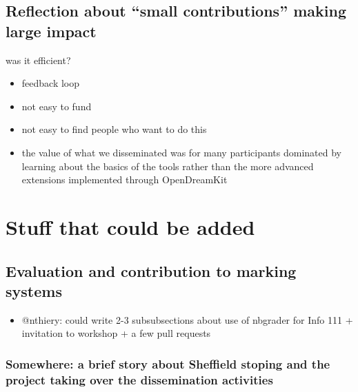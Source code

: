 \documentclass{deliverablereport}
\begin{document}
\subsection{Reflection about ``small contributions'' making large  impact}

was it efficient?

\begin{itemize}
\tightlist
\item
  feedback loop
\item
  not easy to fund
\item
  not easy to find people who want to do this
\item
  the value of what we disseminated was for many participants dominated
  by learning about the basics of the tools rather than the more
  advanced extensions implemented through OpenDreamKit
\end{itemize}

\section{Stuff that could be added}

\subsection{Evaluation and contribution to marking systems}

\begin{itemize}
\tightlist
\item
  @nthiery: could write 2-3 subsubsections about use of nbgrader for Info
  111 + invitation to workshop + a few pull requests
\end{itemize}

\subsubsection{Somewhere: a brief story about Sheffield stoping and the project taking over the dissemination activities}
\end{document}
